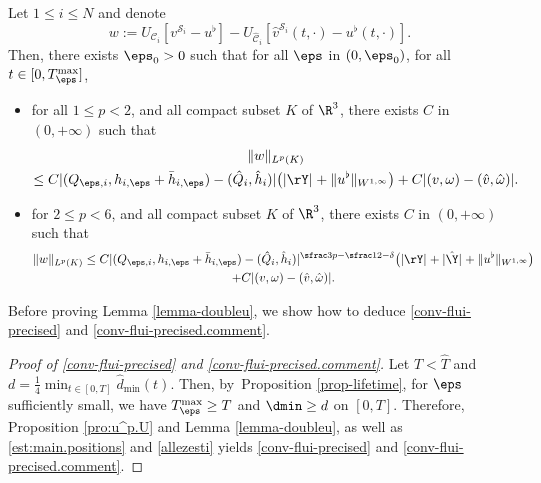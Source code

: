 \begin{Lemma} \label{lemma-doubleu}
Let $1 \leq i \leq N$ and denote\vspace*{-3pt}
\begin{equation}
w := U_{\mathcal C_i}[v^{{\mathcal S}_i} - u^\flat] - U_{\hat{\mathcal C}_i}[{\hat v}^{{\mathcal S}_i}(t,\cdot) - u^\flat (t,\cdot)].
\end{equation}
Then, there exists $\eps_0 > 0$ such that for all $\eps $ in $(0,\eps_0)$, for all $t \in [0,T_\eps^{\max}]$,
\begin{itemize}
\item for
all $1 \leq p < 2$, and all compact subset $K$ of $\R^3$, there exists $C $ in $(0,+\infty)$ such that\vspace*{-3pt}
\begin{multline} \label{omeg-s}
\|w\|_{L^p (K)}\\
\leq C |(Q_{\eps,i},h_{i,\eps} + \bar h_{i,\eps}) - (\hat Q_i,\hat h_i)| \big(|\rY|_{} + \|u^\flat\|_{W^{1,\infty}} \big) + C |(v,\omega) - (\hat v,\hat \omega)|.
\end{multline}
\item for $2 \leq p < 6$, and all compact subset $K$ of $\R^3$, there exists $C $ in $(0,+\infty)$ such that\vspace*{-3pt}
\begin{multline} \label{omeg-s.2}
\|w\|_{L^p (K)} \leq C |(Q_{\eps,i},h_{i,\eps} + \bar h_{i,\eps}) - (\hat Q_i,\hat h_i)|^{\sfrac 3 p - \sfrac 1 2 - \delta} \big(|\rY|_{} + |\hat \Y|_{} + \|u^\flat\|_{W^{1,\infty}} \big)
\\ + C |(v,\omega) - (\hat v,\hat \omega)|.
\end{multline}
\end{itemize}
\end{Lemma}

Before proving Lemma \ref{lemma-doubleu}, we show how to deduce
\eqref{conv-flui-precised} and \eqref{conv-flui-precised.comment}.

\begin{proof}[Proof of \eqref{conv-flui-precised} and \eqref{conv-flui-precised.comment}]

Let $T < \hat T$ and $d = \frac 1 4 \min_{t \in [0,T]} \hat d_{\min}(t)$. Then, by~Proposition \ref{prop-lifetime}, for $\eps$ sufficiently small, we have $T_\eps^{\max} \geq T$ and $\dmin \geq d$ on $[0,T]$. Therefore, Proposition \ref{pro:u^p.U} and
Lemma \ref{lemma-doubleu}, as well as \eqref{est:main.positions} and
\eqref{allezesti} yields \eqref{conv-flui-precised} and \eqref{conv-flui-precised.comment}.
\end{proof}

